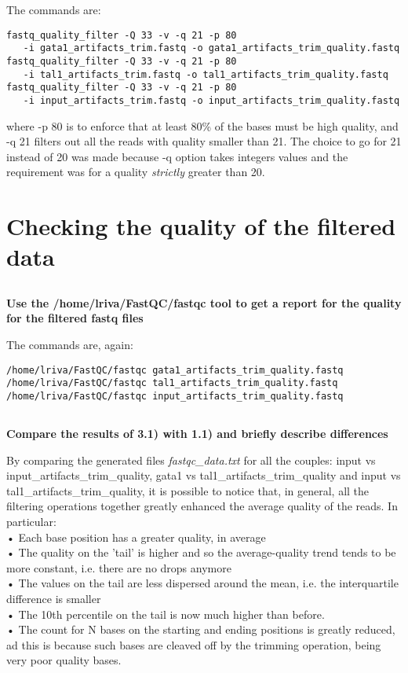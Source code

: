 \documentclass[12pt, a4paper]{article}
\begin{document}
The commands are:

\begin{verbatim}
fastq_quality_filter -Q 33 -v -q 21 -p 80
   -i gata1_artifacts_trim.fastq -o gata1_artifacts_trim_quality.fastq
fastq_quality_filter -Q 33 -v -q 21 -p 80
   -i tal1_artifacts_trim.fastq -o tal1_artifacts_trim_quality.fastq
fastq_quality_filter -Q 33 -v -q 21 -p 80
   -i input_artifacts_trim.fastq -o input_artifacts_trim_quality.fastq
\end{verbatim}

where -p 80 is to enforce that at least 80\% of the bases must be high quality, and -q 21 filters out all the reads with quality smaller than 21. The choice to go for 21 instead of 20 was made because -q option takes integers values and the requirement was for a quality \textit{strictly} greater than 20.

\section{Checking the quality of the filtered data}

\subsection{}
\textbf{Use the /home/lriva/FastQC/fastqc tool to get a report for the quality for the filtered fastq files}

The commands are, again:

\begin{verbatim}
/home/lriva/FastQC/fastqc gata1_artifacts_trim_quality.fastq
/home/lriva/FastQC/fastqc tal1_artifacts_trim_quality.fastq
/home/lriva/FastQC/fastqc input_artifacts_trim_quality.fastq
\end{verbatim}

\subsection{}
\textbf{Compare the results of 3.1) with 1.1) and briefly describe differences}

By comparing the generated files \textit{fastqc\_data.txt} for all the couples: input vs input\_artifacts\_trim\_quality, gata1 vs tal1\_artifacts\_trim\_quality and input vs tal1\_artifacts\_trim\_quality, it is possible to notice that, in general, all the filtering operations together greatly enhanced the average quality of the reads. In particular:\\
• Each base position has a greater quality, in average\\
• The quality on the 'tail' is higher and so the average-quality trend tends to be more constant, i.e. there are no drops anymore\\
• The values on the tail are less dispersed around the mean, i.e. the interquartile difference is smaller\\
• The 10th percentile on the tail is now much higher than before.\\
• The count for N bases on the starting and ending positions is greatly reduced, ad this is because such bases are cleaved off by the trimming operation, being very poor quality bases.\\
\end{document}

